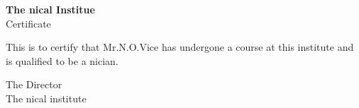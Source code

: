 \documentclass{article}
\begin{document}
\begin{center}
{\bfseries\huge The \Tex nical Institue}\\[1cm]
Certificate
\end{center}
\noindent This is to certify that Mr.N.O.Vice has undergone a
course at this institute and is qualified to be a \Tex nician.
\begin{flushright}
The Director\\
The \Tex nical institute
\end{flushright}
\end{document}
